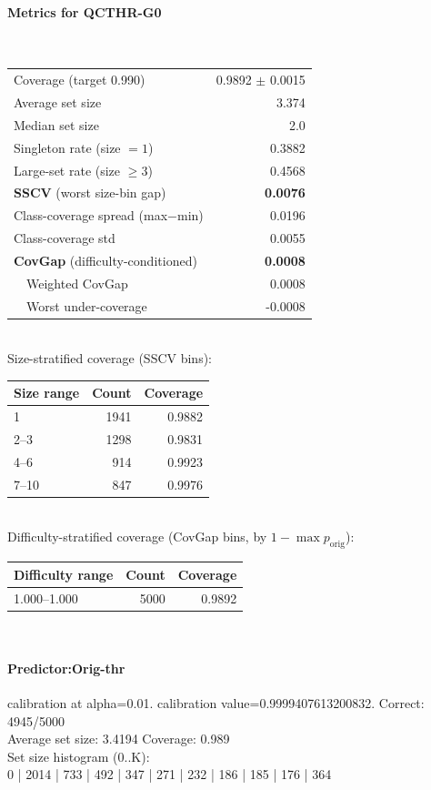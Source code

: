 \documentclass[parskip=half]{scrartcl}
\begin{document}
\paragraph{Metrics for QCTHR-G0}~\\
\begin{tabular}{l r}
\hline
Coverage (target 0.990) & 0.9892 $\pm$ 0.0015 \\
Average set size & 3.374 \\
Median set size & 2.0 \\
Singleton rate (size $=1$) & 0.3882 \\
Large-set rate (size $\geq 3$) & 0.4568 \\
\textbf{SSCV} (worst size-bin gap) & \textbf{0.0076} \\
Class-coverage spread (max$-$min) & 0.0196 \\
Class-coverage std & 0.0055 \\
\textbf{CovGap} (difficulty-conditioned) & \textbf{0.0008} \\
~~Weighted CovGap & 0.0008 \\
~~Worst under-coverage & -0.0008 \\
\hline
\end{tabular}\\[0.5em]
\textsf{\scriptsize Size-stratified coverage (SSCV bins):}\\
\begin{tabular}{l r r}
\hline
Size range & Count & Coverage \\
\hline
1 & 1941 & 0.9882 \\
2--3 & 1298 & 0.9831 \\
4--6 & 914 & 0.9923 \\
7--10 & 847 & 0.9976 \\
\hline
\end{tabular}\\[0.5em]
\textsf{\scriptsize Difficulty-stratified coverage (CovGap bins, by $1-\max p_{\mathrm{orig}}$):}\\
\begin{tabular}{l r r}
\hline
Difficulty range & Count & Coverage \\
\hline
1.000--1.000 & 5000 & 0.9892 \\
\hline
\end{tabular}\\[0.5em]
\paragraph{Predictor:Orig-thr} calibration at alpha=0.01. calibration value=0.9999407613200832. Correct: 4945/5000\\
Average set size: 3.4194   Coverage: 0.989\\
Set size histogram (0..K):\\
0 | 2014 | 733 | 492 | 347 | 271 | 232 | 186 | 185 | 176 | 364\\
\end{document}
